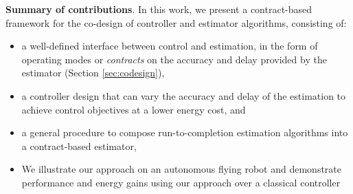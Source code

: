 \textbf{Summary of contributions}.
In this work, we present a contract-based framework for the co-design of controller and estimator algorithms, consisting of:
\begin{itemize}
	\item a well-defined interface between control and estimation, in the form of operating modes or \emph{contracts} on the accuracy and delay provided by the estimator (Section \ref{sec:codesign}),
	\item a controller design that can vary the accuracy and delay of the estimation to achieve control objectives at a lower energy cost, and
	\item a general procedure to compose run-to-completion estimation algorithms into a contract-based estimator,
	\item We illustrate our approach on an autonomous flying robot and demonstrate performance and energy gains using our approach over a classical controller
\end{itemize}